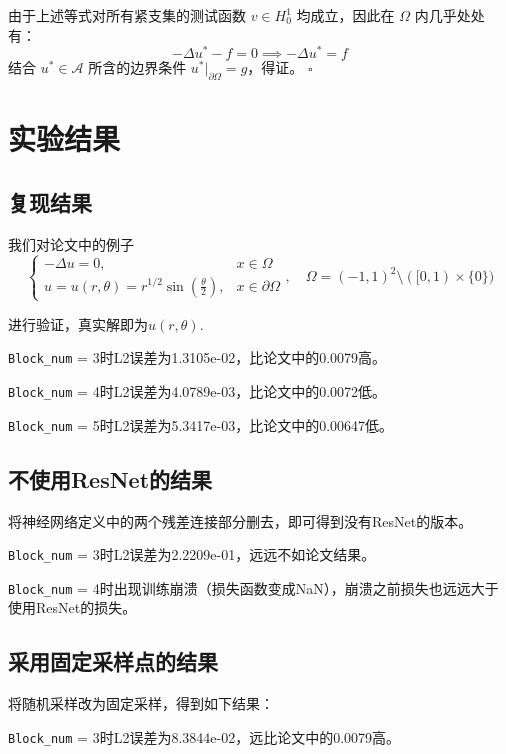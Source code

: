 	由于上述等式对所有紧支集的测试函数 $v \in H^1_0$ 均成立，因此在 $\Omega$ 内几乎处处有：
	\[ -\Delta u^* - f = 0 \implies -\Delta u^* = f \]
	结合 $u^* \in \mathcal{A}$ 所含的边界条件 $u^*|_{\partial\Omega} = g$，得证。
	\hfill $\square$
	
	\section{实验结果}
	
	\subsection{复现结果}
	
	我们对论文中的例子
	\[ 
	\begin{cases} 
		-\Delta u = 0, & x \in \Omega \\ 
		u = u(r,\theta) = r^{1/2}\sin(\frac{\theta}{2}), & x \in \partial\Omega 
	\end{cases}, \quad 
	\Omega = (-1, 1)^2 \setminus ([0, 1) \times \{0\})
	\]
	
	进行验证，真实解即为$u(r,\theta)$.
	
	\texttt{Block\_num} = 3时L2误差为1.3105e-02，比论文中的0.0079高。
	
	\texttt{Block\_num} = 4时L2误差为4.0789e-03，比论文中的0.0072低。
	
	\texttt{Block\_num} = 5时L2误差为5.3417e-03，比论文中的0.00647低。
	
	\subsection{不使用ResNet的结果}
	将神经网络定义中的两个残差连接部分删去，即可得到没有ResNet的版本。
	
	\texttt{Block\_num} = 3时L2误差为2.2209e-01，远远不如论文结果。
	
	\texttt{Block\_num} = 4时出现训练崩溃（损失函数变成NaN），崩溃之前损失也远远大于使用ResNet的损失。
	
	\subsection{采用固定采样点的结果}
	将随机采样改为固定采样，得到如下结果：
	
	\texttt{Block\_num} = 3时L2误差为8.3844e-02，远比论文中的0.0079高。
	
